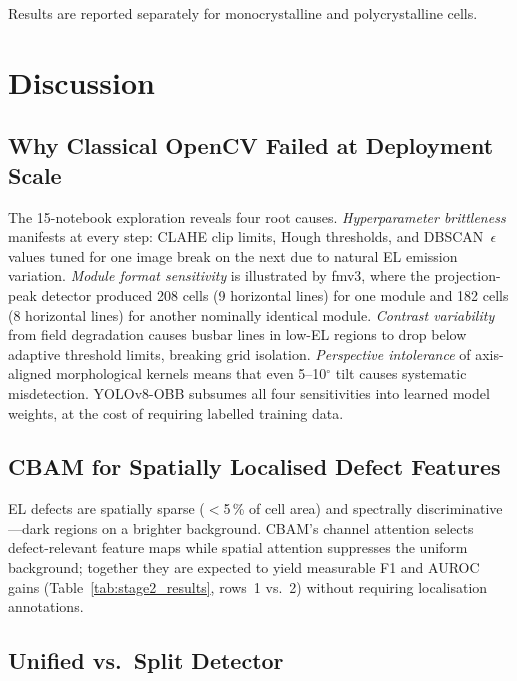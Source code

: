 \documentclass[conference]{IEEEtran}
\begin{document}
Results are reported separately for monocrystalline and
polycrystalline cells.

\section{Discussion}

\subsection{Why Classical OpenCV Failed at Deployment Scale}

The 15-notebook exploration reveals four root causes.
\textit{Hyperparameter brittleness} manifests at every step:
CLAHE clip limits, Hough thresholds, and DBSCAN~$\epsilon$
values tuned for one image break on the next due to natural
EL emission variation.
\textit{Module format sensitivity} is illustrated by fmv3,
where the projection-peak detector produced 208 cells (9
horizontal lines) for one module and 182 cells (8 horizontal
lines) for another nominally identical module.
\textit{Contrast variability} from field degradation causes
busbar lines in low-EL regions to drop below adaptive
threshold limits, breaking grid isolation.
\textit{Perspective intolerance} of axis-aligned morphological
kernels means that even 5--10$^\circ$ tilt causes systematic
misdetection.
YOLOv8-OBB subsumes all four sensitivities into learned
model weights, at the cost of requiring labelled training data.

\subsection{CBAM for Spatially Localised Defect Features}

EL defects are spatially sparse ($<$5\,\% of cell area)
and spectrally discriminative---dark regions on a brighter
background. CBAM's channel attention selects
defect-relevant feature maps while spatial attention
suppresses the uniform background; together they are
expected to yield measurable F1 and AUROC gains
(Table~\ref{tab:stage2_results}, rows~1 vs.\ 2) without
requiring localisation annotations.

\subsection{Unified vs.\ Split Detector}
\end{document}
